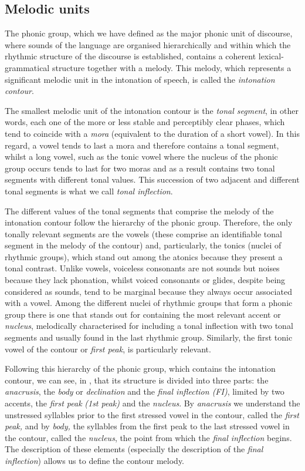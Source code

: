 \documentclass[output=paper]{langscibook}
\begin{document}
\subsection{Melodic units}
The phonic group, which we have defined as the major phonic unit of discourse, where sounds of the language are organised hierarchically and within which the rhythmic structure of the discourse is established, contains a coherent lexical-grammatical structure together with a melody. This melody, which represents a significant melodic unit in the intonation of speech, is called the \textit{intonation contour}. 

The smallest melodic unit of the intonation contour is the \textit{tonal segment}, in other words, each one of the more or less stable and perceptibly clear phases, which tend to coincide with a \textit{mora} (equivalent to the duration of a short vowel). In this regard, a vowel tends to last a mora and therefore contains a tonal segment, whilst a long vowel, such as the tonic vowel where the nucleus of the phonic group occurs tends to last for two moras and as a result contains two tonal segments with different tonal values. This succession of two adjacent and different tonal segments is what we call \textit{tonal inflection}.

The different values of the tonal segments that comprise the melody of the intonation contour follow the hierarchy of the phonic group. Therefore, the only tonally relevant segments are the vowels (these comprise an identifiable tonal segment in the melody of the contour) and, particularly, the tonics (nuclei of rhythmic groups), which stand out among the atonics because they present a tonal contrast. Unlike vowels, voiceless consonants are not sounds but noises because they lack phonation, whilst voiced consonants or glides, despite being considered as sounds, tend to be marginal because they always occur associated with a vowel. Among the different nuclei of rhythmic groups that form a phonic group there is one that stands out for containing the most relevant accent or \textit{nucleus}, melodically characterised for including a tonal inflection with two tonal segments and usually found in the last rhythmic group. Similarly, the first tonic vowel of the contour or \textit{first peak}, is particularly relevant.

Following this hierarchy of the phonic group, which contains the intonation contour, we can see, in , that its structure is divided into three parts: the \textit{anacrusis}, the \textit{body} or  \textit{declination} and the \textit{final inflection (FI)}, limited by two accents, the \textit{first peak} \textit{(1st peak)} and the \textit{nucleus}. By \textit{anacrusis} we understand the unstressed syllables prior to the first stressed vowel in the contour, called the \textit{first peak,} and by \textit{body,} the syllables from the first peak to the last stressed vowel in the contour, called the \textit{nucleus}, the point from which the \textit{final inflection} begins. The description of these elements (especially the description of the \textit{final inflection}) allows us to define the contour melody.
\end{document}
